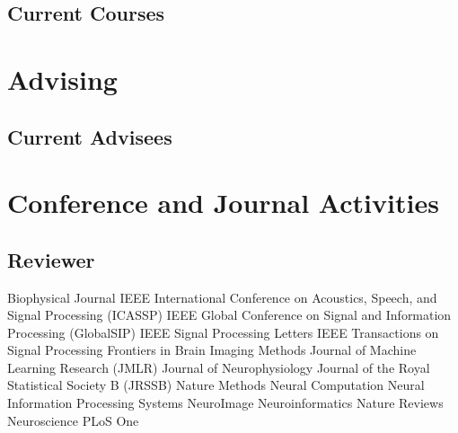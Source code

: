 \documentclass[10pt,colorlinks=true,urlcolor=blue]{moderncv}
\begin{document}
\subsection{Current Courses}


\section{Advising}

\subsection{Current Advisees}





\section{Conference and Journal Activities}

\subsection{Reviewer}
\cventry {} {Biophysical Journal} {}{}{}{}
\cventry {} {IEEE International Conference on Acoustics, Speech, and Signal Processing (ICASSP)} {}{}{}{}
\cventry {} {IEEE Global Conference on Signal and Information Processing (GlobalSIP)} {} {} {} {}
\cventry {} {IEEE Signal Processing Letters} {} {} {} {} 
\cventry {} {IEEE Transactions on Signal Processing} {}{}{}{}
\cventry {} {Frontiers in Brain Imaging Methods} {}{}{}{}
\cventry {} {Journal of Machine Learning Research (JMLR)} {}{}{}{}
\cventry {} {Journal of Neurophysiology} {}{}{}{}
\cventry {} {Journal of the Royal Statistical Society B (JRSSB)} {}{}{}{}
\cventry {} {Nature Methods} {}{}{}{}
\cventry {} {Neural Computation} {}{}{}{}
\cventry {} {Neural Information Processing Systems} {}{}{}{}
\cventry {} {NeuroImage} {}{}{}{}
\cventry {} {Neuroinformatics} {}{}{}{}
\cventry {} {Nature Reviews Neuroscience} {}{}{}{}
\cventry {} {PLoS One} {}{}{}{}
\end{document}

